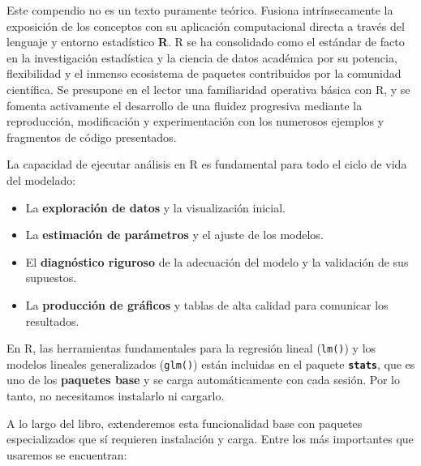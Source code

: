 \documentclass[
  letterpaper,
  DIV=11,
  numbers=noendperiod]{scrreprt}
\providecommand{\tightlist}{%
  \setlength{\itemsep}{0pt}\setlength{\parskip}{0pt}}
\begin{document}
\begin{tcolorbox}[enhanced jigsaw, leftrule=.75mm, breakable, colbacktitle=quarto-callout-note-color!10!white, bottomrule=.15mm, colframe=quarto-callout-note-color-frame, toprule=.15mm, colback=white, coltitle=black, bottomtitle=1mm, left=2mm, title=\textcolor{quarto-callout-note-color}{\faInfo}\hspace{0.5em}{R como lenguaje del modelado estadístico}, opacityback=0, arc=.35mm, opacitybacktitle=0.6, toptitle=1mm, titlerule=0mm, rightrule=.15mm]

Este compendio no es un texto puramente teórico. Fusiona intrínsecamente
la exposición de los conceptos con su aplicación computacional directa a
través del lenguaje y entorno estadístico \textbf{R}. R se ha
consolidado como el estándar de facto en la investigación estadística y
la ciencia de datos académica por su potencia, flexibilidad y el inmenso
ecosistema de paquetes contribuidos por la comunidad científica. Se
presupone en el lector una familiaridad operativa básica con R, y se
fomenta activamente el desarrollo de una fluidez progresiva mediante la
reproducción, modificación y experimentación con los numerosos ejemplos
y fragmentos de código presentados.

La capacidad de ejecutar análisis en R es fundamental para todo el ciclo
de vida del modelado:

\begin{itemize}
\tightlist
\item
  La \textbf{exploración de datos} y la visualización inicial.
\item
  La \textbf{estimación de parámetros} y el ajuste de los modelos.
\item
  El \textbf{diagnóstico riguroso} de la adecuación del modelo y la
  validación de sus supuestos.
\item
  La \textbf{producción de gráficos} y tablas de alta calidad para
  comunicar los resultados.
\end{itemize}

En R, las herramientas fundamentales para la regresión lineal
(\texttt{lm()}) y los modelos lineales generalizados (\texttt{glm()})
están incluidas en el paquete \textbf{\texttt{stats}}, que es uno de los
\textbf{paquetes base} y se carga automáticamente con cada sesión. Por
lo tanto, no necesitamos instalarlo ni cargarlo.

A lo largo del libro, extenderemos esta funcionalidad base con paquetes
especializados que sí requieren instalación y carga. Entre los más
importantes que usaremos se encuentran:


\end{tcolorbox}
\end{document}
